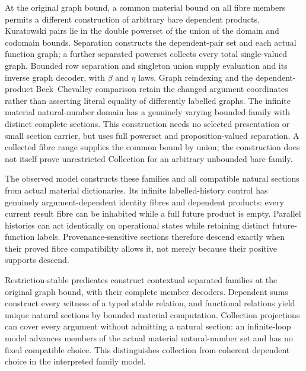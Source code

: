 \documentclass[11pt]{article}
\theoremstyle{definition}
\theoremstyle{remark}
\begin{document}
At the original graph bound, a common material bound on all fibre members
permits a different construction of arbitrary bare dependent products.
Kuratowski pairs lie in the double powerset of the union of the domain and
codomain bounds.  Separation constructs the dependent-pair set and each
actual function graph; a further separated powerset collects every total
single-valued graph.  Bounded row separation and singleton union supply
evaluation and its inverse graph decoder, with $\beta$ and $\eta$ laws.
Graph reindexing and the dependent-product Beck--Chevalley comparison
retain the changed argument coordinates rather than asserting literal
equality of differently labelled graphs.  The infinite material natural-number
domain has a genuinely varying bounded family with distinct complete sections.
This construction needs no selected presentation or small section carrier,
but uses full powerset and proposition-valued separation.  A collected fibre
range supplies the common bound by union; the construction does not itself
prove unrestricted Collection for an arbitrary unbounded bare family.

The observed model constructs these families and all compatible natural
sections from actual material dictionaries.  Its infinite labelled-history
control has genuinely argument-dependent identity fibres and dependent
products: every current result fibre can be inhabited while a full future
product is empty.  Parallel histories can act identically on operational
states while retaining distinct future-function labels.  Provenance-sensitive
sections therefore descend exactly when their proved fibre compatibility
allows it, not merely because their positive supports descend.

Restriction-stable predicates construct contextual separated families at
the original graph bound, with their complete member decoders.  Dependent
sums construct every witness of a typed stable relation, and functional
relations yield unique natural sections by bounded material computation.
Collection projections can cover every argument without admitting a natural
section: an infinite-loop model advances members of the actual material
natural-number set and has no fixed compatible choice.  This distinguishes
collection from coherent dependent choice in the interpreted family model.
\end{document}
